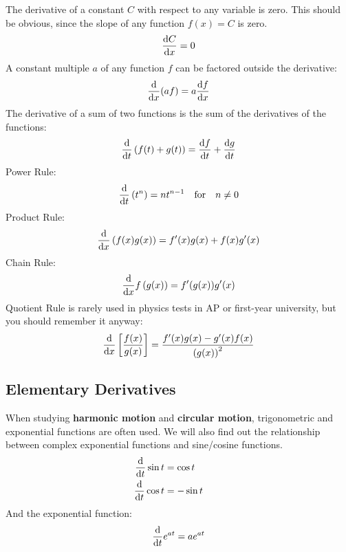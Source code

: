 \documentclass{../../oss-handout}
\begin{document}
The derivative of a constant $C$ with respect to any variable is zero. This
should be obvious, since the slope of any function $f(x)=C$ is zero.
\begin{equation*}
  \diff Cx=0
\end{equation*}
A constant multiple $a$ of any function $f$ can be factored outside the
derivative:
\begin{equation*}
  \diff{}x(af)=a\diff fx
\end{equation*}
The derivative of a sum of two functions is the sum of the derivatives of the
functions:
\begin{equation*}
  \diff{}t\left(f(t)+g(t)\right) = \diff ft+\diff gt
\end{equation*}
Power Rule:
\begin{equation*}
  \diff{}t\left(t^n\right) = nt^{n-1}\quad\text{for}\quad n\neq 0
\end{equation*}
Product Rule:
\begin{equation*}
  \diff{}x\left(f(x)g(x)\right)=f'(x)g(x)+f(x)g'(x)
\end{equation*}
Chain Rule:
\begin{equation*}
  \diff{}xf\left(g(x)\right)=f'(g(x))g'(x)
\end{equation*}
Quotient Rule is rarely used in physics tests in AP or first-year university,
but you should remember it anyway:
\begin{equation*}
  \diff{}x\left[\frac{f(x)}{g(x)}\right]=
  \frac{f'(x)g(x)-g'(x)f(x)}{\left(g(x)\right)^2}
\end{equation*}



\subsection{Elementary Derivatives}
When studying \textbf{harmonic motion} and \textbf{circular motion},
trigonometric and exponential functions are often used. We will also find out
the relationship between complex exponential functions and sine/cosine
functions. %
\begin{align*}
    \diff{}t \sin t &= \cos t \quad\quad\quad\\
    \diff{}t \cos t &= -\sin t
\end{align*}
And the exponential function:
\begin{equation*}
  \diff{}t e^{at} = ae^{at}
\end{equation*}
\end{document}
